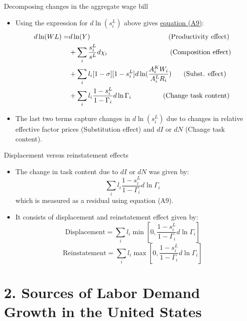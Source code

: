 \documentclass[notes=show]{beamer}
\begin{document}
\begin{frame}{Decomposing changes in the aggregate wage bill}
\begin{itemize}
\item Using the expression for $d \ln (s_{i}^{L})$ above gives \underline{equation (A9)}:
\begin{align*}
d \ln (WL) =  & d \ln (Y) \text{ \hspace{3.8cm} (Productivity effect)} \\
& +  \sum_{i} \frac{s_{i}^{L}}{s^{L}} d \chi_{i} \text{ \hspace{3cm} (Composition effect)} \\
& + \sum_{i} l_{i} [1- \sigma][1-s_{i}^{L}]d \ln (\frac{A_{i}^{K}W_{i}}{A_{i}^{L}R_{i}}) \text{\hspace{0.5cm}  (Subst. effect)} \\
& + \sum_{i} l_{i} \frac{1-s_{i}^{L}}{1- \Gamma_{i}} d \ln \Gamma_{i} \text{ \hspace{1.4cm} (Change task content)}
\end{align*}
\item The last two terms capture changes in $d \ln (s_{i}^{L})$ due to changes in relative effective factor prices (Substitution effect) and $dI$ or $dN$ (Change task content).
\end{itemize}
\end{frame}

\begin{frame}{Displacement versus reinstatement effects}
\begin{itemize}
\item The change in task content due to $dI$ or $dN$ was given by:
\[
 \sum_{i} l_{i} \frac{1-s_{i}^{L}}{1- \Gamma_{i}} d \ln \Gamma_{i}
\]
which is measured as a residual using equation (A9). \medskip
\item It consists of displacement and reinstatement effect given by:
\[
\text{Displacement}= \sum_{i} l_{i} \min \left[ 0, \frac{1-s_{i}^{L}}{1- \Gamma_{i}} d \ln \Gamma_{i} \right] \tag{A14a} \label{eq14a}
\]
\[
\text{Reinstatement}= \sum_{i} l_{i} \max \left[ 0, \frac{1-s_{i}^{L}}{1- \Gamma_{i}} d \ln \Gamma_{i} \right] \tag{A14b} \label{eq14b}
\]
\end{itemize}
\end{frame}

\section{2. Sources of Labor Demand Growth in the United States}
\end{document}
